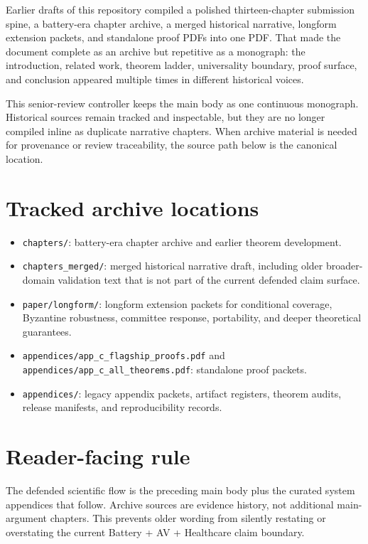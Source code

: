 \documentclass[12pt,oneside]{book}
\begin{document}
Earlier drafts of this repository compiled a polished thirteen-chapter
submission spine, a battery-era chapter archive, a merged historical narrative,
longform extension packets, and standalone proof PDFs into one PDF. That made
the document complete as an archive but repetitive as a monograph: the
introduction, related work, theorem ladder, universality boundary, proof
surface, and conclusion appeared multiple times in different historical voices.

This senior-review controller keeps the main body as one continuous monograph.
Historical sources remain tracked and inspectable, but they are no longer
compiled inline as duplicate narrative chapters. When archive material is
needed for provenance or review traceability, the source path below is the
canonical location.

\section{Tracked archive locations}
\begin{itemize}
  \item \texttt{chapters/}: battery-era chapter archive and earlier theorem
  development.
  \item \texttt{chapters\_merged/}: merged historical narrative draft,
  including older broader-domain validation text that is not part of the
  current defended claim surface.
  \item \texttt{paper/longform/}: longform extension packets for conditional
  coverage, Byzantine robustness, committee response, portability, and deeper
  theoretical guarantees.
  \item \texttt{appendices/app\_c\_flagship\_proofs.pdf} and
  \texttt{appendices/app\_c\_all\_theorems.pdf}: standalone proof packets.
  \item \texttt{appendices/}: legacy appendix packets, artifact registers,
  theorem audits, release manifests, and reproducibility records.
\end{itemize}

\section{Reader-facing rule}
The defended scientific flow is the preceding main body plus the curated system
appendices that follow. Archive sources are evidence history, not additional
main-argument chapters. This prevents older wording from silently restating or
overstating the current Battery + AV + Healthcare claim boundary.
\end{document}
